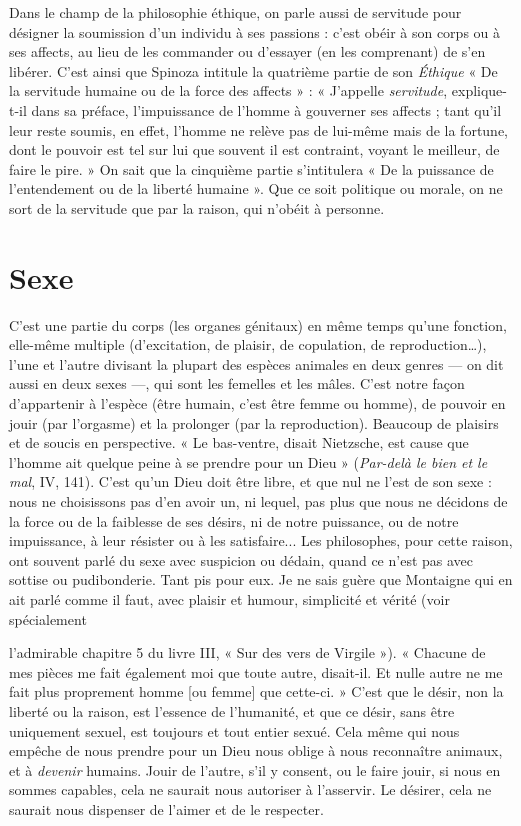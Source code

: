 Dans le champ de la philosophie éthique, on parle aussi de servitude pour
désigner la soumission d’un individu à ses passions : c’est obéir à son corps ou
à ses affects, au lieu de les commander ou d’essayer (en les comprenant) de s’en
libérer. C’est ainsi que Spinoza intitule la quatrième partie de son {\it Éthique} « De
la servitude humaine ou de la force des affects » : « J'appelle {\it servitude}, explique-t-il
dans sa préface, l'impuissance de l’homme à gouverner ses affects ; tant qu'il
leur reste soumis, en effet, l’homme ne relève pas de lui-même mais de la fortune,
dont le pouvoir est tel sur lui que souvent il est contraint, voyant le
meilleur, de faire le pire. » On sait que la cinquième partie s’intitulera « De la
puissance de l’entendement ou de la liberté humaine ». Que ce soit politique
ou morale, on ne sort de la servitude que par la raison, qui n’obéit à personne.

\section{Sexe}
C’est une partie du corps (les organes génitaux) en même temps
qu’une fonction, elle-même multiple (d’excitation, de plaisir, de
copulation, de reproduction…), l’une et l’autre divisant la plupart des espèces
animales en deux genres — on dit aussi en deux sexes —, qui sont les femelles et
les mâles. C’est notre façon d’appartenir à l'espèce (être humain, c’est être
femme ou homme), de pouvoir en jouir (par l’orgasme) et la prolonger (par la
reproduction). Beaucoup de plaisirs et de soucis en perspective.
« Le bas-ventre, disait Nietzsche, est cause que l’homme ait quelque peine
à se prendre pour un Dieu » ({\it Par-delà le bien et le mal}, IV, 141). C’est qu'un
Dieu doit être libre, et que nul ne l’est de son sexe : nous ne choisissons pas
d’en avoir un, ni lequel, pas plus que nous ne décidons de la force ou de la faiblesse
de ses désirs, ni de notre puissance, ou de notre impuissance, à leur
résister ou à les satisfaire... Les philosophes, pour cette raison, ont souvent
parlé du sexe avec suspicion ou dédain, quand ce n’est pas avec sottise ou pudibonderie.
Tant pis pour eux. Je ne sais guère que Montaigne qui en ait parlé
comme il faut, avec plaisir et humour, simplicité et vérité (voir spécialement

l’admirable chapitre 5 du livre III, « Sur des vers de Virgile »). « Chacune de
mes pièces me fait également moi que toute autre, disait-il. Et nulle autre ne
me fait plus proprement homme [ou femme] que cette-ci. » C’est que le désir,
non la liberté ou la raison, est l’essence de l'humanité, et que ce désir, sans être
uniquement sexuel, est toujours et tout entier sexué. Cela même qui nous
empêche de nous prendre pour un Dieu nous oblige à nous reconnaître animaux,
et à {\it devenir} humains. Jouir de l’autre, s’il y consent, ou le faire jouir, si
nous en sommes capables, cela ne saurait nous autoriser à l’asservir. Le désirer,
cela ne saurait nous dispenser de l’aimer et de le respecter.

